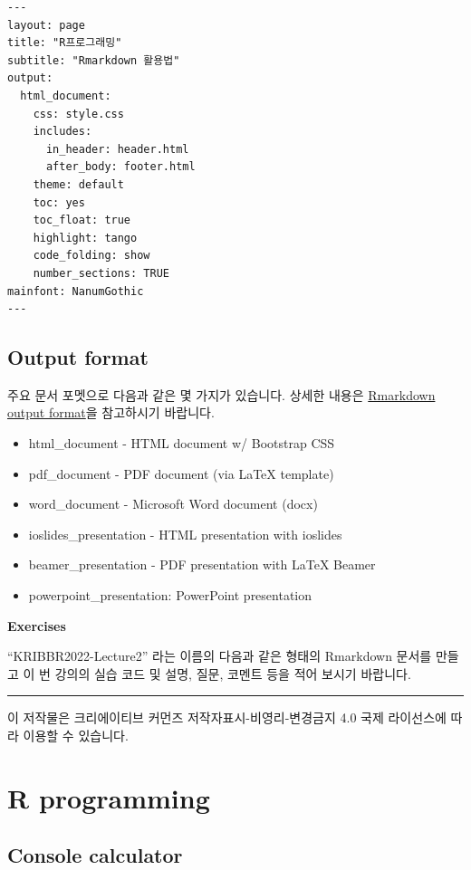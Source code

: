 \documentclass[
]{book}
\providecommand{\tightlist}{%
  \setlength{\itemsep}{0pt}\setlength{\parskip}{0pt}}
\begin{document}
\begin{verbatim}
---
layout: page
title: "R프로그래밍"
subtitle: "Rmarkdown 활용법"
output:
  html_document:
    css: style.css
    includes:
      in_header: header.html
      after_body: footer.html
    theme: default
    toc: yes
    toc_float: true
    highlight: tango
    code_folding: show
    number_sections: TRUE
mainfont: NanumGothic
---
\end{verbatim}

\hypertarget{output-format}{%
\section{Output format}\label{output-format}}

주요 문서 포멧으로 다음과 같은 몇 가지가 있습니다. 상세한 내용은 \href{https://rmarkdown.rstudio.com/lesson-9.html}{Rmarkdown output format}을 참고하시기 바랍니다.

\begin{itemize}
\tightlist
\item
  html\_document - HTML document w/ Bootstrap CSS
\item
  pdf\_document - PDF document (via LaTeX template)
\item
  word\_document - Microsoft Word document (docx)
\item
  ioslides\_presentation - HTML presentation with ioslides
\item
  beamer\_presentation - PDF presentation with LaTeX Beamer
\item
  powerpoint\_presentation: PowerPoint presentation
\end{itemize}

\textbf{Exercises}

``KRIBBR2022-Lecture2'' 라는 이름의 다음과 같은 형태의 Rmarkdown 문서를 만들고 이 번 강의의 실습 코드 및 설명, 질문, 코멘트 등을 적어 보시기 바랍니다.

\begin{center}\rule{0.5\linewidth}{0.5pt}\end{center}

이 저작물은 크리에이티브 커먼즈 저작자표시-비영리-변경금지 4.0 국제 라이선스에 따라 이용할 수 있습니다.

\hypertarget{r-programming}{%
\chapter{R programming}\label{r-programming}}

\hypertarget{console-calculator}{%
\section{Console calculator}\label{console-calculator}}
\end{document}
